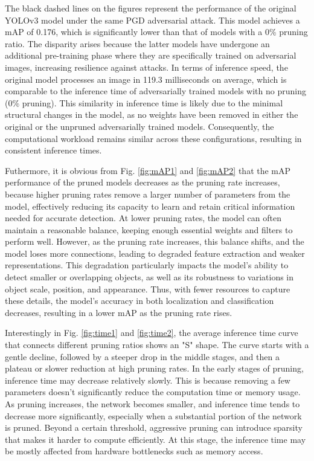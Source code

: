 \documentclass[journal,onecolumn,12pt]{IEEEtran}
\begin{document}
The black dashed lines on the figures represent the performance of the original YOLOv3 model under the same PGD adversarial attack. This model achieves a mAP of 0.176, which is significantly lower than that of models with a 0\% pruning ratio. The disparity arises because the latter models have undergone an additional pre-training phase where they are specifically trained on adversarial images, increasing resilience against attacks. In terms of inference speed, the original model processes an image in 119.3 milliseconds on average, which is comparable to the inference time of adversarially trained models with no pruning (0\% pruning). This similarity in inference time is likely due to the minimal structural changes in the model, as no weights have been removed in either the original or the unpruned adversarially trained models. Consequently, the computational workload remains similar across these configurations, resulting in consistent inference times.

Futhermore, it is obvious from Fig. \ref{fig:mAP1} and \ref{fig:mAP2} that the mAP performance of the pruned models decreases as the pruning rate increases, because higher pruning rates remove a larger number of parameters from the model, effectively reducing its capacity to learn and retain critical information needed for accurate detection. At lower pruning rates, the model can often maintain a reasonable balance, keeping enough essential weights and filters to perform well. However, as the pruning rate increases, this balance shifts, and the model loses more connections, leading to degraded feature extraction and weaker representations. This degradation particularly impacts the model’s ability to detect smaller or overlapping objects, as well as its robustness to variations in object scale, position, and appearance. Thus, with fewer resources to capture these details, the model’s accuracy in both localization and classification decreases, resulting in a lower mAP as the pruning rate rises.

Interestingly in Fig. \ref{fig:time1} and \ref{fig:time2}, the average inference time curve that connects different pruning ratios shows an "S" shape. The curve starts with a gentle decline, followed by a steeper drop in the middle stages, and then a plateau or slower reduction at high pruning rates. In the early stages of pruning, inference time may decrease relatively slowly. This is because removing a few parameters doesn't significantly reduce the computation time or memory usage. As pruning increases, the network becomes smaller, and inference time tends to decrease more significantly, especially when a substantial portion of the network is pruned. Beyond a certain threshold, aggressive pruning can introduce sparsity that makes it harder to compute efficiently. At this stage, the inference time may be mostly affected from hardware bottlenecks such as memory access.
\end{document}
